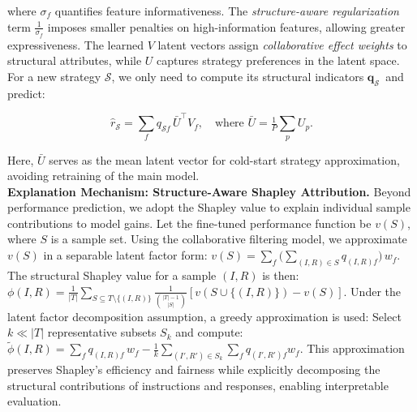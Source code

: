 \documentclass[12pt,a4paper]{article}
\begin{document}
where $\sigma_f$ quantifies feature informativeness. The \emph{structure-aware regularization} term $\tfrac{1}{\sigma_f}$ imposes smaller penalties on high-information features, allowing greater expressiveness. The learned $V$ latent vectors assign \emph{collaborative effect weights} to structural attributes, while $U$ captures strategy preferences in the latent space. For a new strategy $\mathcal{S}$, we only need to compute its structural indicators $\mathbf{q}_{\mathcal{S}}\,$ and predict:

\vspace{-1em}
\begin{equation}
\hat{r}_{\mathcal{S}}
      =\sum_{f} q_{\mathcal{S}f}\,\bar U^\top V_f,
      \quad\text{where }\bar U=\tfrac1P\sum_{p}U_p.
\end{equation}
\vspace{-1em}

Here, $\bar U$ serves as the mean latent vector for cold-start strategy approximation, avoiding retraining of the main model.\\
\textbf{Explanation Mechanism: Structure-Aware Shapley Attribution.}
Beyond performance prediction, we adopt the Shapley value \cite{DBLP:conf/nips/LundbergL17, DBLP:conf/www/AkkasA24} to explain individual sample contributions to model gains. Let the fine-tuned performance function be $v(S)$, where $S$ is a sample set. Using the collaborative filtering model, we approximate $v(S)$ in a separable latent factor form: $v(S)=\sum_{f} \bigl(\sum_{(I,R)\in S}\!q_{(I,R)f}\bigr) \, w_f$. The structural Shapley value for a sample $(I,R)$ is then: $\phi(I,R)=\frac{1}{|T|}\sum_{S\subseteq T\setminus\{(I,R)\}}\!\frac{1}{\binom{|T|-1}{|S|}}\!\left[v(S\cup\{(I,R)\})-v(S)\right].$
Under the latent factor decomposition assumption, a greedy approximation is used: Select $k\ll |T|$ representative subsets $S_k$ and compute: $\tilde{\phi}(I,R)=\!\sum_{f} q_{(I,R)f}\,w_f -\frac{1}{k}\sum_{(I',R')\in S_k}\sum_{f} q_{(I',R')f}w_f.$
This approximation preserves Shapley's efficiency and fairness while explicitly decomposing the structural contributions of instructions and responses, enabling interpretable evaluation.


\vspace{-10pt}
\end{document}
